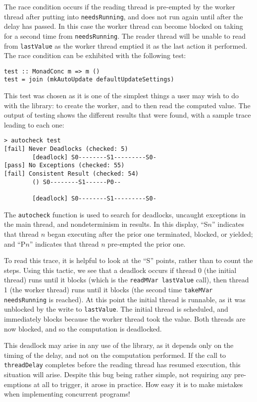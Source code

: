 The race condition occurs if the reading thread is pre-empted by the
worker thread after putting into \verb|needsRunning|, and does not run
again until after the delay has passed.  In this case the worker
thread can become blocked on taking for a second time from
\verb|needsRunning|.  The reader thread will be unable to read from
\verb|lastValue| as the worker thread emptied it as the last action it
performed.  The race condition can be exhibited with the following
test:

\begin{verbatim}
test :: MonadConc m => m ()
test = join (mkAutoUpdate defaultUpdateSettings)
\end{verbatim}

This test was chosen as it is one of the simplest things a user may
wish to do with the library: to create the worker, and to then read
the computed value.  The output of testing shows the different results
that were found, with a sample trace leading to each one:

\begin{verbatim}
> autocheck test
[fail] Never Deadlocks (checked: 5)
        [deadlock] S0--------S1---------S0-
[pass] No Exceptions (checked: 55)
[fail] Consistent Result (checked: 54)
        () S0--------S1------P0--

        [deadlock] S0--------S1---------S0-
\end{verbatim}

The \verb|autocheck| function is used to search for deadlocks,
uncaught exceptions in the main thread, and nondeterminism in
results. In this display, ``S$n$'' indicates that thread $n$ began
executing after the prior one terminated, blocked, or yielded; and
``P$n$'' indicates that thread $n$ pre-empted the prior one.

To read this trace, it is helpful to look at the ``S'' points, rather
than to count the steps.  Using this tactic, we see that a deadlock
occurs if thread 0 (the initial thread) runs until it blocks (which is
the \verb|readMVar lastValue| call), then thread 1 (the worker thread)
runs until it blocks (the second time \verb|takeMVar needsRunning| is
reached).  At this point the initial thread is runnable, as it was
unblocked by the write to \verb|lastValue|.  The initial thread is
scheduled, and immediately blocks because the worker thread took the
value.  Both threads are now blocked, and so the computation is
deadlocked.

This deadlock may arise in any use of the library, as it depends only
on the timing of the delay, and not on the computation performed.  If
the call to \verb|threadDelay| completes before the reading thread has
resumed execution, this situation will arise.  Despite this bug being
rather simple, not requiring any pre-emptions at all to trigger, it
arose in practice.  How easy it is to make mistakes when implementing
concurrent programs!

